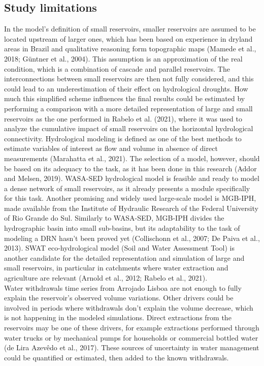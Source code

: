 \documentclass[draft]{agujournal2019}
\begin{document}
\subsection{Study limitations}
In the model’s definition of small reservoirs, smaller reservoirs are assumed to be located upstream of larger ones, which has been based on experience in dryland areas in Brazil and qualitative reasoning form topographic maps (Mamede et al., 2018; Güntner et al., 2004). This assumption is an approximation of the real condition, which is a combination of cascade and parallel reservoirs. The interconnections between small reservoirs are then not fully considered, and this could lead to an underestimation of their effect on hydrological droughts. How much this simplified scheme influences the final results could be estimated by performing a comparison with a more detailed representation of large and small reservoirs as the one performed in Rabelo et al. (2021), where it was used to analyze the cumulative impact of small reservoirs on the horizontal hydrological connectivity. Hydrological modeling is defined as one of the best methods to estimate variables of interest as flow and volume in absence of direct measurements (Marahatta et al., 2021). The selection of a model, however, should be based on its adequacy to the task, as it has been done in this research (Addor and Melsen, 2019). WASA-SED hydrological model is feasible and ready to model a dense network of small reservoirs, as it already presents a module specifically for this task. Another promising and widely used large-scale model is MGB-IPH, made available from the Institute of Hydraulic Research of the Federal University of Rio Grande do Sul. Similarly to WASA-SED, MGB-IPH divides the hydrographic basin into small sub-basins, but its adaptability to the task of modeling a DRN hasn’t been proved yet (Collischonn et al., 2007; De Paiva et al., 2013). SWAT eco-hydrological model (Soil and Water Assessment Tool) is another candidate for the detailed representation and simulation of large and small reservoirs, in particular in catchments where water extraction and agriculture are relevant (Arnold et al., 2012; Rabelo et al., 2021).\\
Water withdrawals time series from Arrojado Lisboa are not enough to fully explain the reservoir’s observed volume variations. Other drivers could be involved in periods where withdrawals don’t explain the volume decrease, which is not happening in the modeled simulations. Direct extractions from the reservoirs may be one of these drivers, for example extractions performed through water trucks or by mechanical pumps for households or commercial bottled water (de Lira Azevêdo et al., 2017). These sources of uncertainty in water management could be quantified or estimated, then added to the known withdrawals.\\
\end{document}
